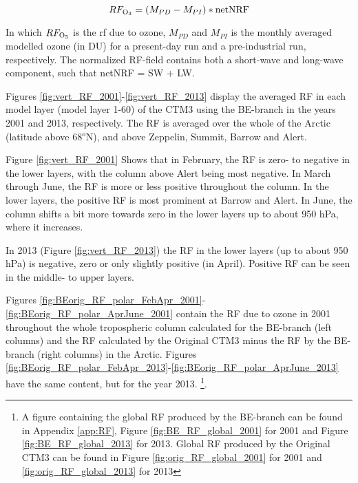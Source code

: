 \begin{equation}
    RF_{\mathrm{O_3}} = (M_{PD} - M_{PI})*\text{netNRF}
    \label{eqn:RF}
\end{equation}

In which $RF_{\mathrm{O_3}}$ is the \acrshort{rf} due to ozone, $M_{PD}$ and $M_{PI}$ is the monthly averaged modelled ozone (in DU) for a present-day run and a pre-industrial run, respectively. The normalized RF-field contains both a short-wave and long-wave component, such that netNRF = SW + LW.

\medskip

Figures \ref{fig:vert_RF_2001}-\ref{fig:vert_RF_2013} display the averaged RF in each model layer (model layer 1-60) of the CTM3 using the BE-branch in the years 2001 and 2013, respectively. The RF is averaged over the whole of the Arctic (latitude above 68$^o$N), and above Zeppelin, Summit, Barrow and Alert. 

\medskip

Figure \ref{fig:vert_RF_2001} Shows that in February, the RF is zero- to negative in the lower layers, with the column above Alert being most negative. In March through June, the RF is more or less positive throughout the column. In the lower layers, the positive RF is most prominent at Barrow and Alert. In June, the column shifts a bit more towards zero in the lower layers up to about 950 hPa, where it increases. 


\medskip

In 2013 (Figure \ref{fig:vert_RF_2013}) the RF in the lower layers (up to about 950 hPa) is negative, zero or only slightly positive (in April). Positive RF can be seen in the middle- to upper layers. 




\medskip


Figures \ref{fig:BEorig_RF_polar_FebApr_2001}-\ref{fig:BEorig_RF_polar_AprJune_2001} contain the RF due to ozone in 2001 throughout the whole tropospheric column calculated for the BE-branch (left columns) and the RF calculated by the Original CTM3 minus the RF by the BE-branch (right columns) in the Arctic. Figures \ref{fig:BEorig_RF_polar_FebApr_2013}-\ref{fig:BEorig_RF_polar_AprJune_2013} have the same content, but for the year 2013. \footnote{A figure containing the global RF produced by the BE-branch can be found in Appendix \ref{app:RF}, Figure \ref{fig:BE_RF_global_2001} for 2001 and Figure \ref{fig:BE_RF_global_2013} for 2013. Global RF produced by the Original CTM3 can be found in Figure \ref{fig:orig_RF_global_2001} for 2001 and \ref{fig:orig_RF_global_2013} for 2013}. 
\medskip 

